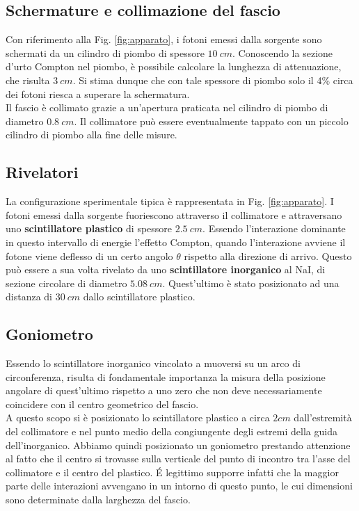 \documentclass[5pt]{article}
\begin{document}
\subsection{Schermature e collimazione del fascio}
Con riferimento alla Fig. \ref{fig:apparato}, i fotoni emessi dalla sorgente sono schermati da un cilindro di piombo di spessore $10 \ cm$. Conoscendo la sezione d'urto Compton nel piombo\cite{PDG_lead}, è possibile calcolare la lunghezza di attenuazione, che risulta $3 \ cm$. Si stima dunque che con tale spessore di piombo solo il 4\% circa dei fotoni riesca a superare la schermatura. \\
Il fascio è collimato grazie a un'apertura praticata nel cilindro di piombo di diametro $0.8 \ cm$. Il collimatore può essere eventualmente tappato con un piccolo cilindro di piombo alla fine delle misure.

\subsection{Rivelatori}
La configurazione sperimentale tipica è rappresentata in Fig. \ref{fig:apparato}. I fotoni emessi dalla sorgente fuoriescono attraverso il collimatore e attraversano uno \textbf{scintillatore plastico} di spessore $2.5 \ cm$. 
Essendo l'interazione dominante in questo intervallo di energie l'effetto Compton, quando
l'interazione avviene il fotone viene deflesso di un certo angolo $\theta$ rispetto alla direzione di arrivo.
Questo può essere a sua volta rivelato da uno \textbf{scintillatore inorganico} al NaI, di sezione circolare di diametro $5.08 \ cm$.
Quest'ultimo è stato posizionato ad una distanza di $30 \ cm$ dallo scintillatore plastico.

\subsection{Goniometro}

Essendo lo scintillatore inorganico vincolato a muoversi su un arco di circonferenza, risulta di fondamentale importanza la misura della posizione angolare di quest'ultimo rispetto a uno zero che non deve necessariamente coincidere con il centro geometrico del fascio. \\
A questo scopo si è posizionato lo scintillatore plastico a circa $2 cm$ dall'estremità del collimatore e nel punto medio della congiungente degli estremi della guida dell'inorganico.
Abbiamo quindi posizionato un goniometro prestando attenzione al fatto che il centro si trovasse sulla verticale del punto di incontro tra l'asse del collimatore e il centro del plastico.
\'E legittimo supporre infatti che la maggior parte delle interazioni avvengano in un intorno di questo punto, le cui dimensioni sono determinate dalla larghezza del fascio. \\
\end{document}
